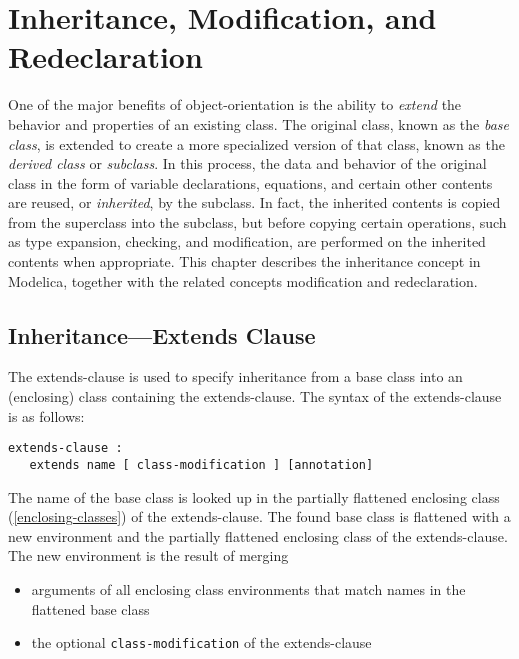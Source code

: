 \chapter{Inheritance, Modification, and Redeclaration}

One of the major benefits of object-orientation is the ability to
\emph{extend} the behavior and properties of an existing class. The
original class, known as the \emph{base class}, is extended to create a
more specialized version of that class, known as the \emph{derived
class} or \emph{subclass}. In this process, the data and behavior of the
original class in the form of variable declarations, equations, and
certain other contents are reused, or \emph{inherited}, by the subclass.
In fact, the inherited contents is copied from the superclass into the
subclass, but before copying certain operations, such as type expansion,
checking, and modification, are performed on the inherited contents when
appropriate. This chapter describes the inheritance concept in Modelica,
together with the related concepts modification and redeclaration.

\section{Inheritance---Extends Clause}

The extends-clause is used to specify inheritance from a base class into
an (enclosing) class containing the extends-clause. The syntax of the
extends-clause is as follows:

\begin{lstlisting}[language=grammar]
extends-clause :
   extends name [ class-modification ] [annotation]
\end{lstlisting}
The name of the base class is looked up in the partially flattened
enclosing class (\autoref{enclosing-classes}) of the extends-clause. The found base
class is flattened with a new environment and the partially flattened
enclosing class of the extends-clause. The new environment is the result
of merging

\begin{itemize}
\item
  arguments of all enclosing class environments that match names in the
  flattened base class
\item
  the optional \lstinline!class-modification! of the extends-clause
\end{itemize}

